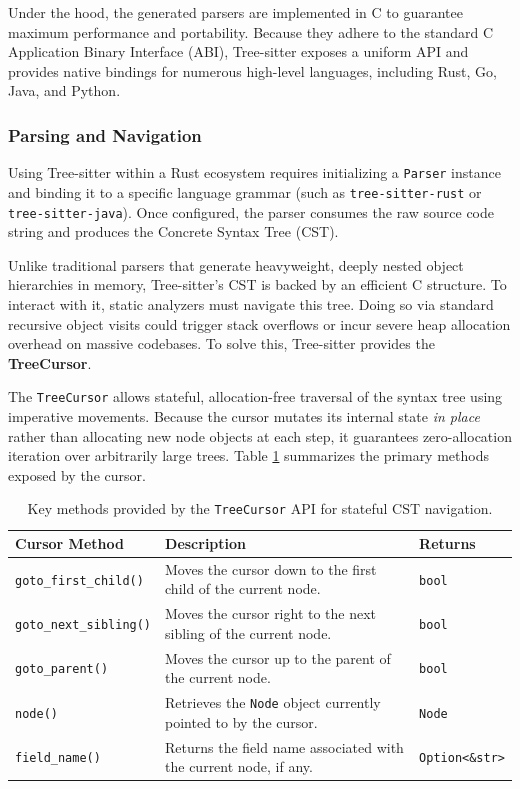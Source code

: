 Under the hood, the generated parsers are implemented in C to
guarantee maximum performance and portability. Because they adhere to
the standard C Application Binary Interface (ABI), Tree-sitter
exposes a uniform API and provides native bindings for numerous
high-level languages, including Rust, Go, Java, and Python.

\subsubsection{Parsing and Navigation}

Using Tree-sitter within a Rust ecosystem requires initializing a
\texttt{Parser} instance and binding it to a specific language grammar
(such as \texttt{tree-sitter-rust} or \texttt{tree-sitter-java}).
Once configured, the parser consumes the raw source code string and
produces the Concrete Syntax Tree (CST).

Unlike traditional parsers that generate heavyweight, deeply nested
object hierarchies in memory, Tree-sitter's CST is backed by an
efficient C structure. To interact with it, static analyzers must
navigate this tree. Doing so via standard recursive object visits
could trigger stack overflows or incur severe heap allocation overhead
on massive codebases. To solve this, Tree-sitter provides the
\textbf{TreeCursor}.

The \texttt{TreeCursor} allows stateful, allocation-free traversal of
the syntax tree using imperative movements. Because the cursor mutates
its internal state \textit{in place} rather than allocating new node
objects at each step, it guarantees zero-allocation iteration over
arbitrarily large trees. Table \ref{tab:treecursor_methods} summarizes
the primary methods exposed by the cursor.

\begin{table}[ht]
  \footnotesize
  \centering
  \begin{tabularx}{\linewidth}{|l|X|l|}
    \hline
    \textbf{Cursor Method} & \textbf{Description} & \textbf{Returns} \\
    \hline
    \texttt{goto\_first\_child()} & Moves the cursor down to the
    first child of the current node. & \texttt{bool} \\
    \texttt{goto\_next\_sibling()} & Moves the cursor right to the
    next sibling of the current node. & \texttt{bool} \\
    \texttt{goto\_parent()} & Moves the cursor up to the parent of
    the current node. & \texttt{bool} \\
    \texttt{node()} & Retrieves the \texttt{Node} object currently
    pointed to by the cursor. & \texttt{Node} \\
    \texttt{field\_name()} & Returns the field name associated with
    the current node, if any. & \texttt{Option<\&str>} \\
    \hline
  \end{tabularx}
  \caption{Key methods provided by the \texttt{TreeCursor} API for
  stateful CST navigation.}
  \label{tab:treecursor_methods}
\end{table}

